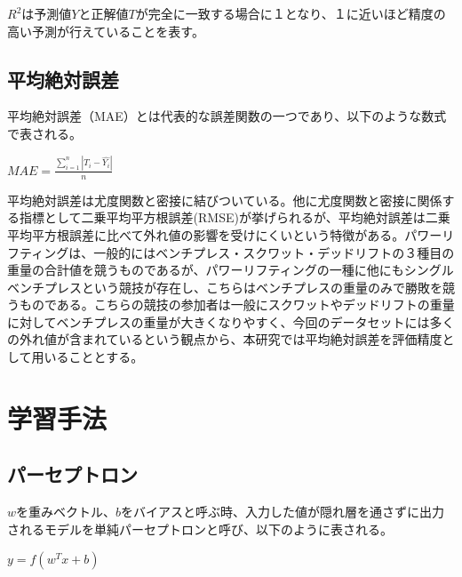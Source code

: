 \documentclass{article}
\begin{document}
\begin{math}R^2\end{math}は予測値\begin{math}Y\end{math}と正解値\begin{math}T\end{math}が完全に一致する場合に１となり、１に近いほど精度の高い予測が行えていることを表す。


\subsection{平均絶対誤差}

平均絶対誤差（MAE）とは代表的な誤差関数の一つであり、以下のような数式で表される。

\begin{center}
\begin{math}
MAE = \frac{\sum_{i=1}^{n}|T_i-\hat{Y_i}|}{n} 
\end{math}
\end{center}

平均絶対誤差は尤度関数と密接に結びついている。他に尤度関数と密接に関係する指標として二乗平均平方根誤差(RMSE)が挙げられるが、平均絶対誤差は二乗平均平方根誤差に比べて外れ値の影響を受けにくいという特徴がある。パワーリフティングは、一般的にはベンチプレス・スクワット・デッドリフトの３種目の重量の合計値を競うものであるが、パワーリフティングの一種に他にもシングルベンチプレスという競技が存在し、こちらはベンチプレスの重量のみで勝敗を競うものである。こちらの競技の参加者は一般にスクワットやデッドリフトの重量に対してベンチプレスの重量が大きくなりやすく、今回のデータセットには多くの外れ値が含まれているという観点から、本研究では平均絶対誤差を評価精度として用いることとする。


\section{学習手法}
\subsection{パーセプトロン}

\begin{math}w\end{math}を重みベクトル、\begin{math}b\end{math}をバイアスと呼ぶ時、入力した値が隠れ層を通さずに出力されるモデルを単純パーセプトロンと呼び、以下のように表される。

\begin{center}
\begin{math}
y = f(w^{T}x+b)
\end{math}
\end{center}
\end{document}
